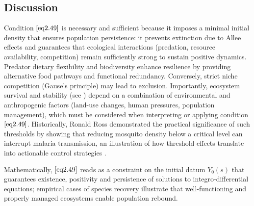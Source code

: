 \documentclass[10pt, a4paper]{amsart}
\theoremstyle{plain}
\theoremstyle{definition}
\theoremstyle{remark}
\numberwithin{equation}{section}
\begin{document}
\subsection*{\bf Discussion}
Condition $\eqref{eq2.49}$ is necessary and sufficient because it imposes a minimal initial density that ensures population persistence: it prevents extinction due to Allee effects and guarantees that ecological interactions (predation, resource availability, competition) remain sufficiently strong to sustain positive dynamics. Predator dietary flexibility and biodiversity enhance resilience by providing alternative food pathways and functional redundancy. Conversely, strict niche competition (Gause’s principle) may lead to exclusion. Importantly, ecosystem survival and stability (see \cite{ref55}) depend on a combination of environmental and anthropogenic factors (land-use changes, human pressures, population management), which must be considered when interpreting or applying condition $\eqref{eq2.49}$. Historically, Ronald Ross demonstrated the practical significance of such thresholds by showing that reducing mosquito density below a critical level can interrupt malaria transmission, an illustration of how threshold effects translate into actionable control strategies \cite{ref5}.

Mathematically, $\eqref{eq2.49}$ reads as a constraint on the initial datum $Y_0(s)$ that guarantees existence, positivity and persistence of solutions to integro-differential equations; empirical cases of species recovery illustrate that well-functioning and properly managed ecosystems enable population rebound.
\end{document}
